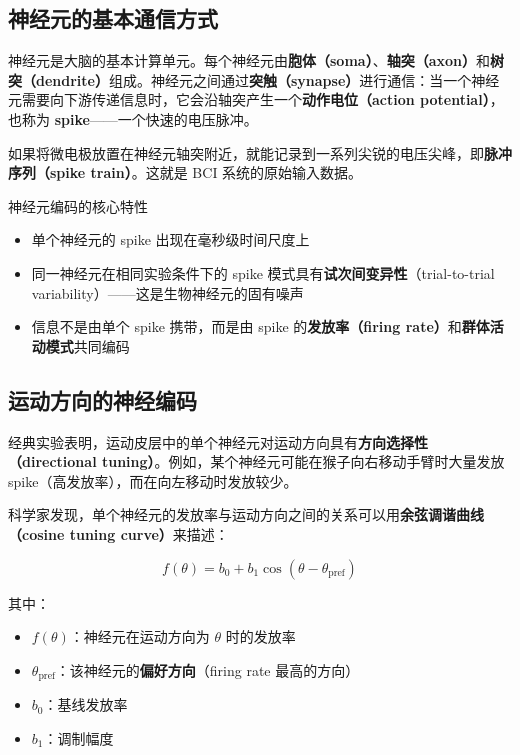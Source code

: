 \documentclass[a4paper]{article}
\begin{document}
\subsection{神经元的基本通信方式}




神经元是大脑的基本计算单元。每个神经元由\textbf{胞体（soma）}、\textbf{轴突（axon）}和\textbf{树突（dendrite）}组成。神经元之间通过\textbf{突触（synapse）}进行通信：当一个神经元需要向下游传递信息时，它会沿轴突产生一个\textbf{动作电位（action potential）}，也称为 \textbf{spike}——一个快速的电压脉冲。

如果将微电极放置在神经元轴突附近，就能记录到一系列尖锐的电压尖峰，即\textbf{脉冲序列（spike train）}。这就是 BCI 系统的原始输入数据。

\begin{importantbox}{神经元编码的核心特性}
\begin{itemize}
    \item 单个神经元的 spike 出现在毫秒级时间尺度上
    \item 同一神经元在相同实验条件下的 spike 模式具有\textbf{试次间变异性}（trial-to-trial variability）——这是生物神经元的固有噪声
    \item 信息不是由单个 spike 携带，而是由 spike 的\textbf{发放率（firing rate）}和\textbf{群体活动模式}共同编码
\end{itemize}
\end{importantbox}

\subsection{运动方向的神经编码}




经典实验表明，运动皮层中的单个神经元对运动方向具有\textbf{方向选择性（directional tuning）}。例如，某个神经元可能在猴子向右移动手臂时大量发放 spike（高发放率），而在向左移动时发放较少。

科学家发现，单个神经元的发放率与运动方向之间的关系可以用\textbf{余弦调谐曲线（cosine tuning curve）}来描述：

$$f(\theta) = b_0 + b_1 \cos(\theta - \theta_{\text{pref}})$$

其中：
\begin{itemize}
    \item $f(\theta)$：神经元在运动方向为 $\theta$ 时的发放率
    \item $\theta_{\text{pref}}$：该神经元的\textbf{偏好方向}（firing rate 最高的方向）
    \item $b_0$：基线发放率
    \item $b_1$：调制幅度
\end{itemize}
\end{document}
